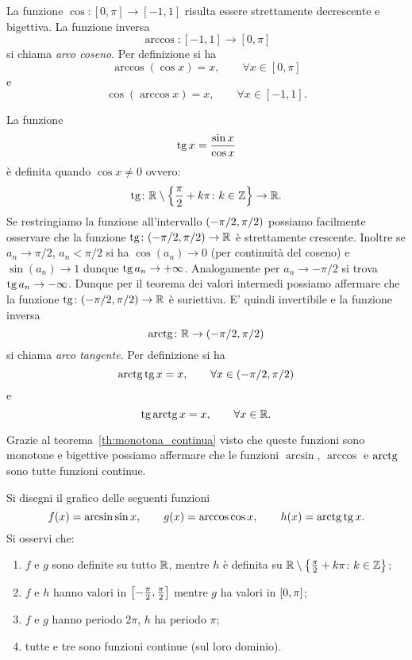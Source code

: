 La funzione $\cos \colon[0,\pi] \to [-1,1]$ risulta essere strettamente
decrescente e bigettiva.
La funzione inversa
\[
  \arccos\colon[-1,1] \to [0,\pi]
\]
si chiama \emph{arco coseno}. Per definizione si ha
\[
  \arccos(\cos x) = x, \qquad \forall x \in [0,\pi]
\]
e
\[
    \cos(\arccos x) = x, \qquad \forall x \in [-1,1].
\]

La funzione
%
\[
\operatorname{tg} x = \frac{\sin x}{\cos x}
\]
è definita quando $\cos x\neq 0$ ovvero:
\[
  \operatorname{tg} \colon {\mathbb R} \setminus{\left\{ \frac \pi 2+ k\pi\colon k\in {\mathbb Z}\right\}} \to {\mathbb R}.
\]
Se restringiamo la funzione all'intervallo ${\left( -\pi/2, \pi/2 \right)}$ possiamo
facilmente osservare che la funzione $\operatorname{tg}\colon(-\pi/2,\pi/2)\to {\mathbb R}$ è strettamente crescente. Inoltre se $a_n \to \pi/2$, $a_n<\pi/2$ si ha $\cos(a_n)\to 0$ (per continuità del coseno) e $\sin(a_n)\to 1$ dunque $\operatorname{tg} a_n\to +\infty$. Analogamente per $a_n \to -\pi/2$ si trova $\operatorname{tg} a_n \to -\infty$. Dunque per il teorema dei valori intermedi possiamo affermare che la funzione $\operatorname{tg}\colon(-\pi/2,\pi/2)\to {\mathbb R}$ è suriettiva. E' quindi invertibile
e la funzione inversa
\[
  \operatorname{arctg} \colon {\mathbb R} \to (-\pi/2,\pi/2)
\]
si chiama \emph{arco tangente}. Per definizione si ha
\[
  \operatorname{arctg} \operatorname{tg} x = x, \qquad \forall x \in (-\pi/2, \pi/2)
\]
e
\[
  \operatorname{tg}\operatorname{arctg} x = x, \qquad \forall x \in {\mathbb R}.
\]

Grazie al teorema~\ref{th:monotona_continua}
visto che queste funzioni sono monotone e bigettive
possiamo affermare che
le funzioni $\arcsin$, $\arccos$ e $\operatorname{arctg}$ 
sono tutte funzioni continue.

\begin{exercise}
  Si disegni il grafico delle seguenti funzioni
  \[
    f(x) = \arcsin \sin x, \qquad 
    g(x) = \arccos \cos x, \qquad 
    h(x) = \operatorname{arctg} \operatorname{tg} x.
  \]
  Si osservi che:
  \begin{enumerate} 
    \item $f$ e $g$ sono definite su tutto ${\mathbb R}$,
  mentre $h$ è definita su ${\mathbb R}\setminus{\left\{ \frac{\pi}2+k\pi\colon k\in {\mathbb Z}\right\}}$;
    \item $f$ e $h$ hanno valori 
  in $\left[-\frac \pi 2,\frac \pi 2\right]$
  mentre $g$ ha valori in $\left[0,\pi\right]$;
    \item $f$ e $g$ hanno periodo $2\pi$,
  $h$ ha periodo $\pi$;
    \item tutte e tre sono funzioni continue (sul loro dominio).
  \end{enumerate}
\end{exercise}

